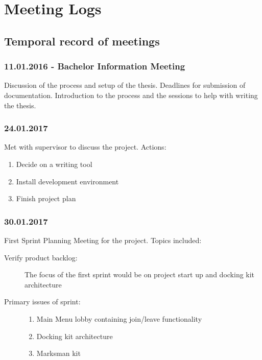 \chapter{Meeting Logs}
\section{Temporal record of meetings}
\subsection*{11.01.2016 - Bachelor Information Meeting}
Discussion of the process and setup of the thesis.  Deadlines for submission of documentation.  Introduction to the process and the sessions to help with writing the thesis.

\subsection*{24.01.2017}
Met with supervisor to discuss the project. Actions:
\begin{enumerate}
	\item Decide on a writing tool
	\item Install development environment
	\item Finish project plan
\end{enumerate}

\subsection*{30.01.2017}
First Sprint Planning Meeting for the project. Topics included:
\begin{description} 
    \item[Verify product backlog:]  The focus of the first sprint would be on project start up and docking kit architecture 
    \item[Primary issues of sprint: ] \mbox{}
    \begin{enumerate}
        \item Main Menu lobby containing join/leave functionality
        \item Docking kit architecture
        \item Marksman kit
    \end{enumerate}
\end{description}

